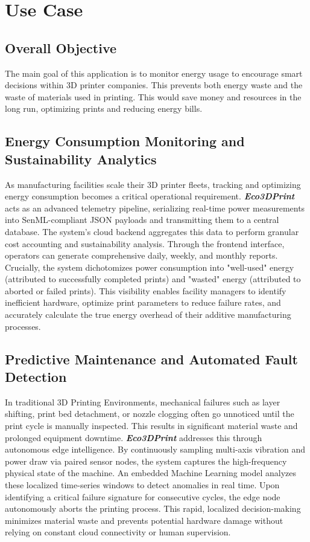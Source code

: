 \chapter{Use Case}
\section{Overall Objective}
The main goal of this application is to monitor energy usage to encourage smart decisions within 3D printer companies. This prevents both energy waste and the waste of materials used in printing. This would save money and resources in the long run, optimizing prints and reducing energy bills.

\section{Energy Consumption Monitoring and Sustainability Analytics}
As manufacturing facilities scale their 3D printer fleets, tracking and optimizing energy consumption becomes a critical operational requirement. \textbf{\textit{Eco3DPrint}} acts as an advanced telemetry pipeline, serializing real-time power measurements into SenML-compliant JSON payloads and transmitting them to a central database. The system's cloud backend aggregates this data to perform granular cost accounting and sustainability analysis. Through the frontend interface, operators can generate comprehensive daily, weekly, and monthly reports. Crucially, the system dichotomizes power consumption into "well-used" energy (attributed to successfully completed prints) and "wasted" energy (attributed to aborted or failed prints). This visibility enables facility managers to identify inefficient hardware, optimize print parameters to reduce failure rates, and accurately calculate the true energy overhead of their additive manufacturing processes.

\section{Predictive Maintenance and Automated Fault Detection}
In traditional 3D Printing Environments, mechanical failures such as layer shifting, print bed detachment, or nozzle clogging often go unnoticed until the print cycle is manually inspected. This results in significant material waste and prolonged equipment downtime. \textbf{\textit{Eco3DPrint}} addresses this through autonomous edge intelligence. By continuously sampling multi-axis vibration and power draw via paired sensor nodes, the system captures the high-frequency physical state of the machine. An embedded Machine Learning model analyzes these localized time-series windows to detect anomalies in real time. Upon identifying a critical failure signature for consecutive cycles, the edge node autonomously aborts the printing process. This rapid, localized decision-making minimizes material waste and prevents potential hardware damage without relying on constant cloud connectivity or human supervision.

